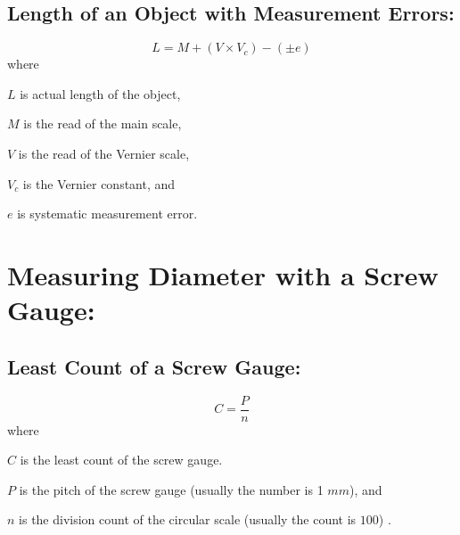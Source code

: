 \documentclass[a4paper]{report}
\begin{document}
        \subsection{Length of an Object with Measurement Errors: }
            \begin{equation}
                L = M + (V \times V_c) - (\pm e)
            \end{equation}
            where
            \begin{description}
                \item $L$ is actual length of the object,
                \item $M$ is the read of the main scale,
                \item $V$ is the read of the Vernier scale,
                \item $V_c$ is the Vernier constant, and
                \item $e$ is systematic measurement error.
            \end{description}
    \section{Measuring Diameter with a Screw Gauge:}
        \subsection{Least Count of a Screw Gauge: }
            \begin{equation}
                C = \frac{P}{n}
            \end{equation}
            where
            \begin{description}
                \item $C$ is the least count of the screw gauge.
                \item $P$ is the pitch of the screw gauge (usually the number is 1 $mm$), and
                \item $n$ is the division count of the circular scale (usually the count is $100$) .
            \end{description}
\end{document}
